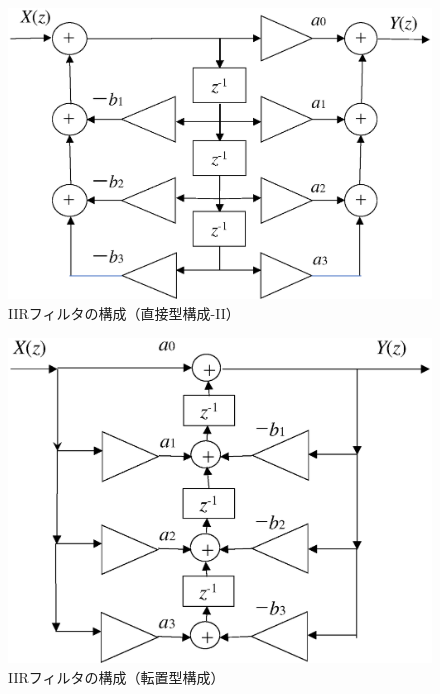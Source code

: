 \begin{figure}[H]
\begin{center}
\begin{minipage}{.7\textwidth}
\begin{center}
\includegraphics[width=\textwidth]{fig/zu-6-16-b.eps}
\end{center}
\end{minipage}
\end{center}
\caption{IIRフィルタの構成（直接型構成-II）}
\label{fig:zu-6-16-2}
\end{figure}

\begin{figure}[H]
\begin{center}
\begin{minipage}{.7\textwidth}
\begin{center}
\includegraphics[width=\textwidth]{fig/zu-6-16-c.eps}
\end{center}
\end{minipage}
\end{center}
\caption{IIRフィルタの構成（転置型構成）}
\label{fig:zu-6-16-3}
\end{figure}


